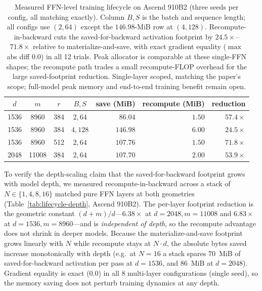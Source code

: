 \begin{table}[h]
\centering
\footnotesize
\caption{Measured FFN-level training lifecycle on Ascend 910B2 (three seeds
per config, all matching exactly).  Column $B,S$ is the batch and sequence
length; all configs use $(2,64)$ except the $146.98$-MiB row at $(4,128)$.
Recompute-in-backward cuts the
saved-for-backward activation footprint by $24.5\times$--$71.8\times$ relative
to materialize-and-save, with exact gradient equality ($\max$ abs diff $0.0$)
in all 12 trials.  Peak allocator is comparable at these single-FFN shapes; the
recompute path trades a small recompute-FLOP overhead for the large
saved-footprint reduction.  Single-layer scoped, matching the paper's scope;
full-model peak memory and end-to-end training benefit remain open.}
\label{tab:lifecycle}
\begin{tabular}{ccccrrr}
\toprule
$d$ & $m$ & $r$ & $B,S$ & save (MiB) & recompute (MiB) & reduction \\
\midrule
1536 & 8960 & 384 & $2,64$ & $86.04$ & $1.50$ & $57.4\times$ \\
1536 & 8960 & 384 & $4,128$ & $146.98$ & $6.00$ & $24.5\times$ \\
1536 & 8960 & 512 & $2,64$ & $107.76$ & $1.50$ & $71.8\times$ \\
2048 & 11008 & 384 & $2,64$ & $107.70$ & $2.00$ & $53.9\times$ \\
\bottomrule
\end{tabular}
\end{table}

To verify the depth-scaling claim that the saved-for-backward footprint
grows with model depth, we measured recompute-in-backward across a stack of
$N\!\in\!\{1,4,8,16\}$ matched pure FFN layers at both geometries
(Table~\ref{tab:lifecycle-depth}, Ascend 910B2).  The per-layer footprint
reduction is the geometric constant $(d{+}m)/d$---$6.38\times$ at
$d{=}2048,m{=}11008$ and $6.83\times$ at $d{=}1536,m{=}8960$---and is
\emph{independent of depth}, so the recompute advantage does not shrink in
deeper models.  Because the materialize-and-save footprint grows linearly with
$N$ while recompute stays at $N{\cdot}d$, the absolute bytes saved increase
monotonically with depth (e.g.\ at $N{=}16$ a stack spares $70$~MiB of
saved-for-backward activation per pass at $d{=}1536$, and $86$~MiB at
$d{=}2048$).  Gradient equality is
exact ($0.0$) in all 8 multi-layer configurations (single seed), so the
memory saving does not perturb training dynamics at any depth.

